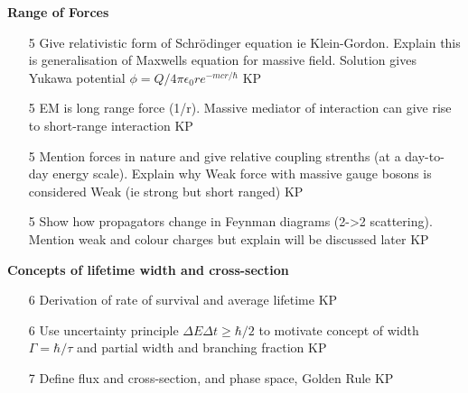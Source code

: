 {\bf Range of Forces}
\begin{itemize}
\item [5] Give relativistic form of Schr\"odinger equation ie Klein-Gordon. Explain this is generalisation of Maxwells equation for massive field. Solution gives Yukawa potential $\phi=Q/4\pi\epsilon_{0}re^{-mcr/\hbar}$ KP
\item[5] EM is long range force (1/r). Massive mediator of interaction can give rise to short-range interaction KP
\item[5] Mention forces in nature and give relative coupling strenths (at a day-to-day energy scale). Explain why Weak force with massive gauge bosons is considered Weak (ie strong but short ranged) KP
\item[5] Show how propagators change in Feynman diagrams (2->2 scattering). Mention weak and colour charges but explain will be discussed later KP
\end{itemize}

{\bf Concepts of lifetime width and cross-section}
\begin{itemize}
\item[6] Derivation of rate of survival and average lifetime KP
\item[6] Use uncertainty principle $\Delta E\Delta t\geq \hbar/2$ to motivate concept of width $\Gamma=\hbar/\tau$ and partial width and branching fraction KP
\item[7] Define flux and cross-section, and phase space, Golden Rule KP
\end{itemize}

